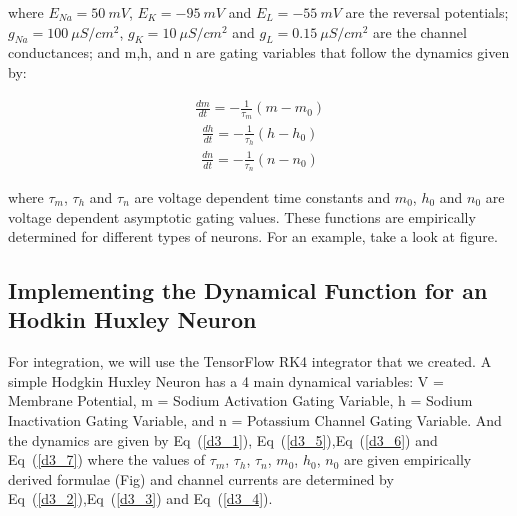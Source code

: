 \documentclass[10pt,letterpaper]{article}
\begin{document}
where $E_{Na}=50\ mV$, $E_K = -95\ mV$ and $E_L=-55\ mV$ are the reversal potentials; $g_{Na} = 100\ \mu S/cm^2$, $g_K = 10\ \mu S/cm^2$ and $g_L = 0.15\ \mu S/cm^2$ are the channel conductances; and m,h, and n are gating variables that follow the dynamics given by:

\begin{eqnarray}\label{d3_5}\frac{dm}{dt} = - \frac{1}{\tau_m}(m-m_0)\end{eqnarray}
\begin{eqnarray}\label{d3_6}\frac{dh}{dt} = - \frac{1}{\tau_h}(h-h_0)\end{eqnarray}
\begin{eqnarray}\label{d3_7}\frac{dn}{dt} = - \frac{1}{\tau_n}(n-n_0)\end{eqnarray}

where $\tau_m$, $\tau_h$ and $\tau_n$ are voltage dependent time constants and $m_0$, $h_0$ and $n_0$ are voltage dependent asymptotic gating values. These functions are empirically determined for different types of neurons. For an example, take a look at figure.

\subsection*{Implementing the Dynamical Function for an Hodkin Huxley Neuron}

For integration, we will use the TensorFlow RK4 integrator that we created. A simple Hodgkin Huxley Neuron has a 4 main dynamical variables: V = Membrane Potential, m = Sodium Activation Gating Variable, h = Sodium Inactivation Gating Variable, and n = Potassium Channel Gating Variable. And the dynamics are given by Eq~(\ref{d3_1}), Eq~(\ref{d3_5}),Eq~(\ref{d3_6}) and Eq~(\ref{d3_7}) where the values of $\tau_m$, $\tau_h$, $\tau_n$, $m_0$, $h_0$, $n_0$ are given empirically derived formulae (Fig) and channel currents are determined by Eq~(\ref{d3_2}),Eq~(\ref{d3_3}) and Eq~(\ref{d3_4}).
\end{document}
